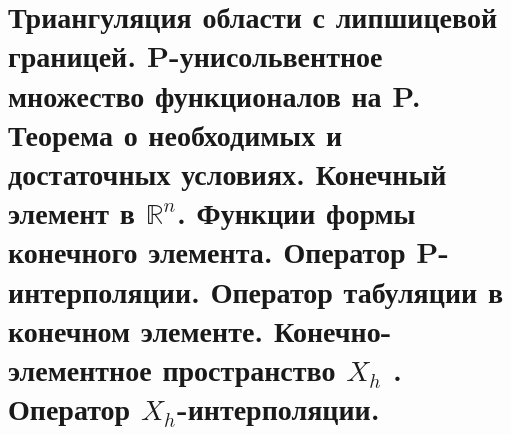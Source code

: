 \documentclass[__main__.tex]{subfiles}
\begin{document}
\section{Триангуляция области с липшицевой границей. P-унисольвентное множество функционалов на P. Теорема о необходимых и достаточных условиях. Конечный элемент в $\mathbb{R}^n$. Функции формы конечного элемента. Оператор P-интерполяции. Оператор табуляции в конечном элементе. Конечно-элементное пространство $X_h$ . Оператор $X_h$-интерполяции.}
\end{document}

